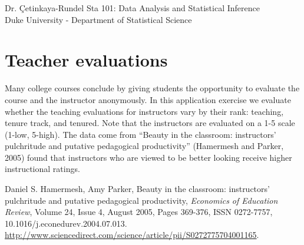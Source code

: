 \documentclass[11pt]{article}
\newcommand{\appno}[1]
{4.4}
\begin{document}

Dr. \c{C}etinkaya-Rundel \hfill Sta 101: Data Analysis and Statistical Inference \\
Duke University - Department of Statistical Science \hfill \\

\ttl{Application exercise \appno{}: \\
ANOVA}



\section*{Teacher evaluations}

Many college courses conclude by giving students the opportunity to evaluate the course and the instructor 
anonymously. In this application exercise we evaluate whether the teaching evaluations for instructors vary 
by their rank: teaching, tenure track, and tenured. Note that the instructors are evaluated on a 1-5 scale (1-low, 5-high). 
The data come from ``Beauty in the classroom: instructors' pulchritude and putative pedagogical productivity'' 
(Hamermesh and Parker, 2005) found that instructors who are viewed to be better looking receive higher 
instructional ratings.

{\scriptsize Daniel S. Hamermesh, Amy Parker, Beauty in the classroom: instructors' pulchritude 
and putative pedagogical productivity, \textit{Economics of Education Review}, Volume 24, Issue 4, August 2005, 
Pages 369-376, ISSN 0272-7757, 10.1016/j.econedurev.2004.07.013. \\
\href{http://www.sciencedirect.com/science/article/pii/S0272775704001165}{http://www.sciencedirect.com/science/article/pii/S0272775704001165}.} 
\end{document}
